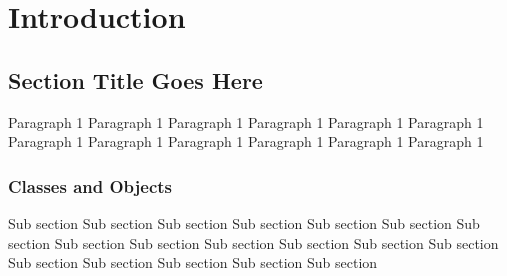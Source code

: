 \setcounter{page}{1}

\chapter{Introduction}

\section{Section Title Goes Here}

Paragraph 1 Paragraph 1 Paragraph 1 Paragraph 1 Paragraph 1 Paragraph 1 Paragraph 1 Paragraph 1 Paragraph 1 Paragraph 1 Paragraph 1 Paragraph 1 

\subsection{Classes and Objects}

Sub section Sub section Sub section Sub section Sub section Sub section Sub section Sub section Sub section Sub section Sub section Sub section Sub section Sub section Sub section Sub section Sub section Sub section 